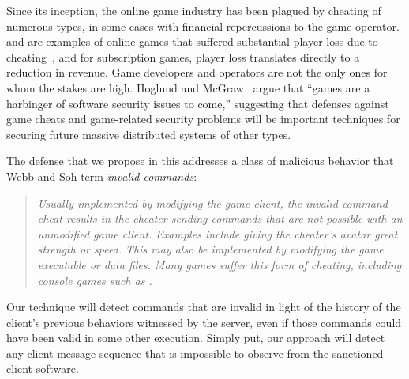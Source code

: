 Since its inception, the online game industry has been plagued by
cheating of numerous types, in some cases with financial repercussions
to the game operator.  \ageofempires and \americasarmy are examples of
online games that suffered substantial player loss due to
cheating~\cite{spohn:cheating}, and for subscription games, player
loss translates directly to a reduction in revenue.  Game
developers and operators are not the only ones for whom the stakes are
high.  Hoglund and McGraw~\cite{hoglund07:games} argue that ``games
are a harbinger of software security issues to come,'' suggesting that
defenses against game cheats and game-related security problems will
be important techniques for securing future massive distributed
systems of other types.

The defense that we propose in this \dissertation addresses a class of
malicious behavior that Webb and Soh term {\em invalid commands}:

\begin{quote} {\sl Usually implemented by modifying the game client,
    the invalid command cheat results in the cheater sending commands
    that are not possible with an unmodified game client. Examples
    include giving the cheater's avatar great strength or speed. This
    may also be implemented by modifying the game executable or data
    files. Many games suffer this form of cheating, including console
    games such as \gearsofwar.}~\cite[Section 4.2.3]{webb08:survey}
  \end{quote}

Our technique will detect commands that are invalid in light of the
history of the client's previous behaviors witnessed by the server,
even if those commands could have been valid in some other execution.
Simply put, our approach will detect any client message sequence that
is impossible to observe from the sanctioned client software.


